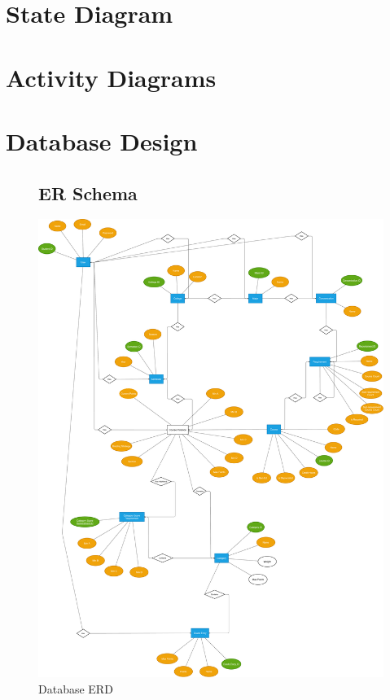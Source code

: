 \documentclass[12pt]{article}
\begin{document}
\section{State Diagram}

\section{Activity Diagrams}

\section{Database Design}

\begin{figure}[p!]
  \subsection{ER Schema}
  \centering
  \includegraphics[width=\linewidth]{database_erd.pdf}
  \caption{Database ERD}
\end{figure}
\end{document}

